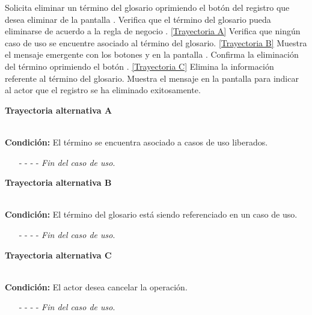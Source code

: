 	\begin{UCtrayectoria}
		\UCpaso[\UCactor] Solicita eliminar un término del glosario oprimiendo el botón \eliminar del registro que desea eliminar de la pantalla .
		\UCpaso[\UCsist] Verifica que el término del glosario pueda eliminarse de acuerdo a la regla de negocio . \hyperlink{CU6-3:TAA}{[Trayectoria A]}
		\UCpaso[\UCsist] Verifica que ningún caso de uso se encuentre asociado al término del glosario. \hyperlink{CU6-3:TAB}{[Trayectoria B]}
		\UCpaso[\UCsist] Muestra el mensaje emergente  con los botones  y  en la pantalla .
		\UCpaso[\UCactor] Confirma la eliminación del término oprimiendo el botón . \hyperlink{CU6-3:TAC}{[Trayectoria C]}
		\UCpaso[\UCsist] Elimina la información referente al término del glosario.
		\UCpaso[\UCsist] Muestra el mensaje  en la pantalla  para indicar al actor que el registro se ha eliminado exitosamente.
	\end{UCtrayectoria}		
\hypertarget{CU6-3:TAA}{\textbf{Trayectoria alternativa A}}\\
\noindent \textbf{Condición:} El término se encuentra asociado a casos de uso liberados.
\begin{enumerate}
	\UCpaso[\UCsist] Oculta el botón \eliminar del término que esta asociado a casos de uso liberados.
	\item[- -] - - {\em {Fin del caso de uso}}.
\end{enumerate}
\hypertarget{CU6-3:TAB}{\textbf{Trayectoria alternativa B}}\\
\noindent \textbf{Condición:} El término del glosario está siendo referenciado en un caso de uso.
\begin{enumerate}
	\UCpaso[\UCsist] Muestra el mensaje  en la pantalla  en una pantalla emergente con la lista de casos de uso que están referenciando al término del glosario.
	\UCpaso[\UCactor] Oprime el botón  de la pantalla emergente.
	\UCpaso[\UCsist] Muestra la pantalla .
	\item[- -] - - {\em {Fin del caso de uso}}.
\end{enumerate}
\hypertarget{CU6-3:TAC}{\textbf{Trayectoria alternativa C}}\\
\noindent \textbf{Condición:} El actor desea cancelar la operación.
\begin{enumerate}
	\UCpaso[\UCactor] Oprime el botón  de la pantalla emergente.
	\UCpaso[\UCsist] Muestra la pantalla .
	\item[- -] - - {\em {Fin del caso de uso}}.%
\end{enumerate}	


